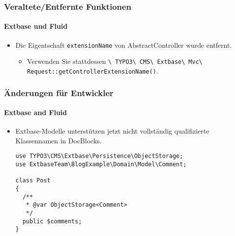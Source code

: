 \begin{frame}[fragile]
	\frametitle{Veraltete/Entfernte Funktionen}
	\framesubtitle{Extbase und Fluid}

	\begin{itemize}
		\item Die Eigentschaft \texttt{extensionName} von AbstractController wurde entfernt.

			\begin{itemize}\smaller
				\item[\ding{228}] Verwenden Sie stattdessen \texttt{\textbackslash
					TYPO3\textbackslash
					CMS\textbackslash
					Extbase\textbackslash
					Mvc\textbackslash
					Request::getControllerExtensionName()}.
			\end{itemize}\normalsize

	\end{itemize}

\end{frame}


\begin{frame}[fragile]
	\frametitle{Änderungen für Entwickler}
	\framesubtitle{Extbase and Fluid}

	\lstset{basicstyle=\tiny\ttfamily}

	\begin{itemize}
		\item Extbase-Modelle unterstützen jetzt nicht vollständig qualifizierte Klassennamen in DocBlocks.

\begin{lstlisting}
use TYPO3\CMS\Extbase\Persistence\ObjectStorage;
use ExtbaseTeam\BlogExample\Domain\Model\Comment;

class Post
{
  /**
   * @var ObjectStorage<Comment>
   */
  public $comments;
}
\end{lstlisting}

	\end{itemize}

\end{frame}



